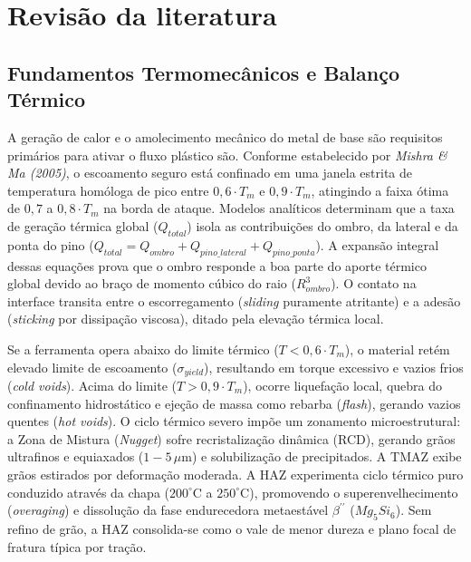\documentclass[12pt,openany]{report}
\begin{document}
\chapter{Revisão da literatura}

\section{Fundamentos Termomecânicos e Balanço Térmico}

A geração de calor e o amolecimento mecânico do metal de base são requisitos primários para ativar o fluxo plástico são. Conforme estabelecido por \textit{Mishra \& Ma (2005)}, o escoamento seguro está confinado em uma janela estrita de temperatura homóloga de pico entre $0,6 \cdot T_m$ e $0,9 \cdot T_m$, atingindo a faixa ótima de $0,7$ a $0,8 \cdot T_m$ na borda de ataque. Modelos analíticos determinam que a taxa de geração térmica global ($Q_{total}$) isola as contribuições do ombro, da lateral e da ponta do pino ($Q_{total} = Q_{ombro} + Q_{pino\_lateral} + Q_{pino\_ponta}$). A expansão integral dessas equações prova que o ombro responde a boa parte do aporte térmico global devido ao braço de momento cúbico do raio ($R_{ombro}^3$). O contato na interface transita entre o escorregamento (\textit{sliding} puramente atritante) e a adesão (\textit{sticking} por dissipação viscosa), ditado pela elevação térmica local. 

Se a ferramenta opera abaixo do limite térmico ($T < 0,6 \cdot T_m$), o material retém elevado limite de escoamento ($\sigma_{yield}$), resultando em torque excessivo e vazios frios (\textit{cold voids}). Acima do limite ($T > 0,9 \cdot T_m$), ocorre liquefação local, quebra do confinamento hidrostático e ejeção de massa como rebarba (\textit{flash}), gerando vazios quentes (\textit{hot voids}). O ciclo térmico severo impõe um zonamento microestrutural: a Zona de Mistura (\textit{Nugget}) sofre recristalização dinâmica (RCD), gerando grãos ultrafinos e equiaxados ($1-5\,\mu\text{m}$) e solubilização de precipitados. A TMAZ exibe grãos estirados por deformação moderada. A HAZ experimenta ciclo térmico puro conduzido através da chapa ($200^\circ\text{C}$ a $250^\circ\text{C}$), promovendo o superenvelhecimento (\textit{overaging}) e dissolução da fase endurecedora metaestável $\beta^{\prime\prime}$ ($Mg_5Si_6$). Sem refino de grão, a HAZ consolida-se como o vale de menor dureza e plano focal de fratura típica por tração.
\end{document}
